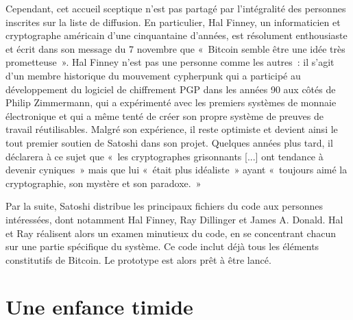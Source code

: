 Cependant, cet accueil sceptique n'est pas partagé par l'intégralité des personnes inscrites sur la liste de diffusion. En particulier, Hal Finney, un informaticien et cryptographe américain d'une cinquantaine d'années, est résolument enthousiaste et écrit dans son message du 7 novembre que «~Bitcoin semble être une idée très prometteuse~». Hal Finney n'est pas une personne comme les autres~: il s'agit d'un membre historique du mouvement cypherpunk qui a participé au développement du logiciel de chiffrement PGP dans les années 90 aux côtés de Philip Zimmermann, qui a expérimenté avec les premiers systèmes de monnaie électronique et qui a même tenté de créer son propre système de preuves de travail réutilisables. Malgré son expérience, il reste optimiste et devient ainsi le tout premier soutien de Satoshi dans son projet. Quelques années plus tard, il déclarera à ce sujet que «~les cryptographes grisonnants [...] ont tendance à devenir cyniques~» mais que lui «~était plus idéaliste~» ayant «~toujours aimé la cryptographie, son mystère et son paradoxe.~»

Par la suite, Satoshi distribue les principaux fichiers du code aux personnes intéressées, dont notamment Hal Finney, Ray Dillinger et James A. Donald. Hal et Ray réalisent alors un examen minutieux du code, en se concentrant chacun sur une partie spécifique du système. Ce code inclut déjà tous les éléments constitutifs de Bitcoin. Le prototype est alors prêt à être lancé.

\section*{Une enfance timide}

